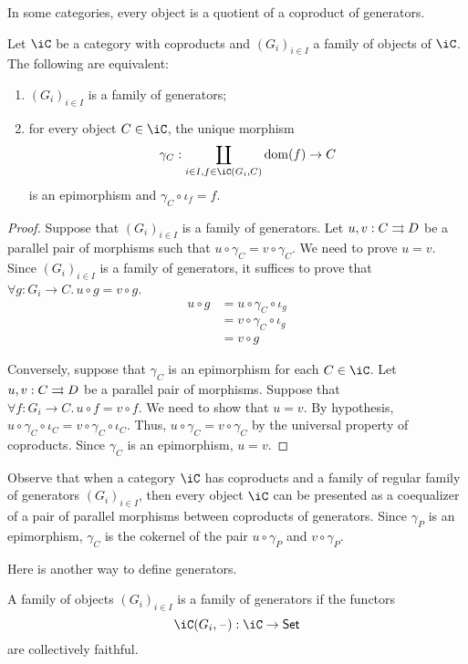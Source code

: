 \documentclass{amsart}
\begin{document}
In some categories, every object is a quotient of a coproduct of generators.
\begin{prop}
  Let $\iC$ be a category with coproducts and $(G_{i})_{i \in I}$ a family of objects of $\iC$.
  The following are equivalent:
  \begin{enumerate}
  \item $(G_{i})_{i \in I}$ is a family of generators;
  \item for every object $C \in \iC$, the unique morphism
    \[
      \gamma_{C} : \coprod_{i \in I, f \in \iC(G_{i}, C)} \dom(f) \to C
    \]
    is an epimorphism and $\gamma_{C} \circ \iota_{f} = f$.
  \end{enumerate}
\end{prop}
\begin{proof}
  Suppose that $(G_{i})_{i \in I}$ is a family of generators.
  Let $u,v : C \rightrightarrows D$ be a parallel pair of morphisms such that $u \circ \gamma_{C} = v \circ \gamma_{C}$.
  We need to prove $u = v$.
  Since $(G_{i})_{i \in I}$ is a family of generators, it suffices to prove that $\forall g : G_{i} \to C.\,u \circ g = v \circ g$.
  \begin{align}
    u \circ g &= u \circ \gamma_{C} \circ \iota_{g}\\
          &= v \circ \gamma_{C} \circ \iota_{g}\\
          &= v \circ g
  \end{align}

  Conversely, suppose that $\gamma_{C}$ is an epimorphism for each $C \in \iC$.
  Let $u,v : C \rightrightarrows D$ be a parallel pair of morphisms.
  Suppose that $\forall f : G_{i} \to C.\, u \circ f = v \circ f$.
  We need to show that $u = v$.
  By hypothesis, $u \circ \gamma_{C} \circ \iota_{C} = v \circ \gamma_{C} \circ \iota_{C}$.
  Thus, $u \circ \gamma_{C} = v \circ \gamma_{C}$ by the universal property of coproducts.
  Since $\gamma_{C}$ is an epimorphism, $u = v$.
\end{proof}

Observe that when a category $\iC$ has coproducts and a family of regular family of generators $(G_{i})_{i \in I}$, then every object $\iC$ can be presented as a coequalizer of a pair of parallel morphisms between coproducts of generators.
Since $\gamma_{P}$ is an epimorphism, $\gamma_{C}$ is the cokernel of the pair $u \circ \gamma_{P}$ and $v \circ \gamma_{P}$.
\[\]

Here is another way to define generators.
\begin{defn}
  A family of objects $(G_{i})_{i \in I}$ is a family of generators if the functors
  \[
    \iC(G_{i}, \blank) : \iC \to \mathsf{Set}
  \]
  are collectively faithful.
\end{defn}
\end{document}
